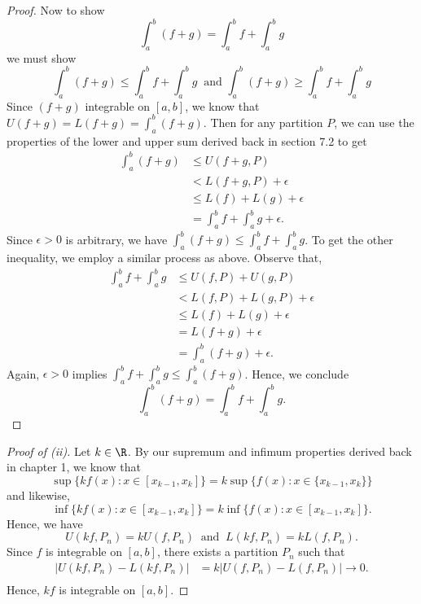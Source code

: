 \begin{proof}
	Now to show 
	\[  \int_{ a }^{ b } (f+g)  = \int_{ a }^{ b } f + \int_{ a }^{ b } g \]
	we must show 
	\[  \int_{ a }^{ b } (f+g) \leq \int_{ a }^{ b } f + \int_{ a }^{ b } g \ \text{ and } \int_{ a }^{ b } (f+g) \geq \int_{ a }^{ b } f + \int_{ a }^{ b } g  \]
	Since \( (f+g)  \) integrable on \( [a,b] \), we know that \( U(f+g) = L(f+g) = \int_{ a }^{ b } (f+g)  \). Then for any partition \( P  \), we can use the properties of the lower and upper sum derived back in section 7.2 to get 
	\begin{align*}
	    \int_{ a }^{ b } (f+g)  &\leq U(f+g, P) \\
								&< L(f+g, P) + \epsilon \\
								&\leq L(f) + L(g) + \epsilon \\
								&= \int_{ a }^{ b } f  + \int_{ a }^{ b } g + \epsilon.
	\end{align*}
	Since \( \epsilon > 0   \) is arbitrary, we have \( \int_{ a }^{ b } (f+g)  \leq \int_{ a }^{ b } f + \int_{ a }^{ b } g  \). To get the other inequality, we employ a similar process as above. Observe that, 
	\begin{align*}
	    \int_{ a }^{ b } f + \int_{ a }^{ b } g &\leq U(f,P) + U(g, P)\\
												&< L(f,P) + L(g,P) + \epsilon \\
												&\leq L(f) + L(g) + \epsilon \\
												&= L(f+g) + \epsilon \\
												&= \int_{ a }^{ b } (f+g) + \epsilon.
	\end{align*}
	Again, \( \epsilon > 0    \) implies \( \int_{ a }^{ b } f + \int_{ a }^{ b }  g \leq \int_{ a }^{ b } (f+g) \). Hence, we conclude
	\[  \int_{ a }^{ b } (f+g) = \int_{ a }^{ b } f + \int_{ a }^{ b } g. \]
	
\end{proof}

\begin{proof}[Proof of (ii)]
	Let \( k \in \R  \). By our supremum and infimum properties derived back in chapter 1, we know that 
	\[  \sup \{ k f(x) : x \in [x_{k-1}, x_{k }]  \} = k \sup \{ f(x) : x \in \{ x_{k-1}, x_{k} \}  \}   \]
	and likewise, 
	\[  \inf \{ kf(x) : x \in [x_{k-1}, x_{k}] \} = k \inf \{ f(x) : x  \in [x_{k-1}, x_{k }]  \}.  \]
	Hence, we have
	\[  U(kf, P_{n}) = k U(f, P_{n}) \ \text{ and } \ L(kf, P_{n}) = k L(f, P_{n}).  \]
	Since \( f  \) is integrable on \( [a,b]  \), there exists a partition \( P_{n} \) such that 
	\begin{align*}
	    | U(kf, P_{n}) - L(kf, P_{n}) | &= k | U(f, P_{n}) - L(f, P_{n}) | \to 0.  \\
	\end{align*}
	Hence, \( kf  \) is integrable on \( [a,b] \).

\end{proof}

